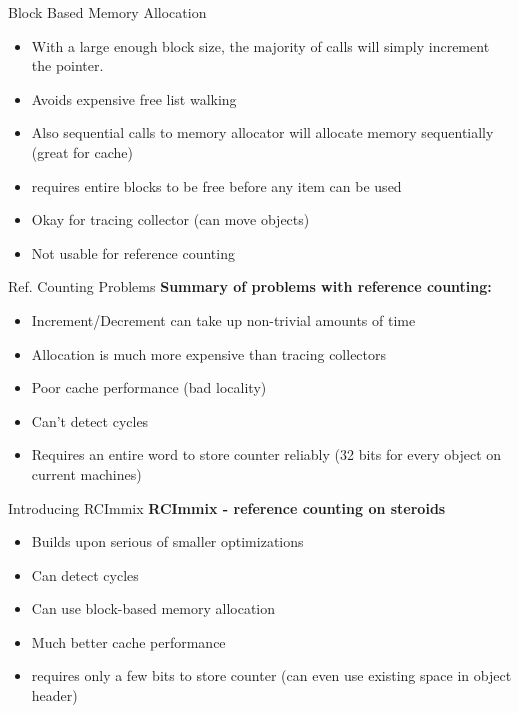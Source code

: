 \documentclass{beamer}
\begin{document}
\begin{frame}{Block Based Memory Allocation}
	\begin{itemize}
		\item With a large enough block size, the majority of calls will simply increment the pointer.
		\item Avoids expensive free list walking
		\item Also sequential calls to memory allocator will allocate memory sequentially (great for cache)
		\pause
		\item requires entire blocks to be free before any item can be used
		\pause
		\item Okay for tracing collector (can move objects)
		\pause
		\item Not usable for reference counting
	\end{itemize}
\end{frame}

\begin{frame}{Ref. Counting Problems}
	\textbf{Summary of problems with reference counting:}
	\begin{itemize}
		\item Increment/Decrement can take up non-trivial amounts of time
		\item Allocation is much more expensive than tracing collectors
		\item Poor cache performance (bad locality)
		\item Can't detect cycles
		\item Requires an entire word to store counter reliably (32 bits for every object on current machines)
	\end{itemize}
\end{frame}

\begin{frame}{Introducing RCImmix}
	\textbf{RCImmix - reference counting on steroids}
	\begin{itemize}
		\item Builds upon serious of smaller optimizations
		\item Can detect cycles
		\item Can use block-based memory allocation
		\item Much better cache performance
		\item requires only a few bits to store counter (can even use existing space in object header)
	\end{itemize}
\end{frame}
\end{document}
